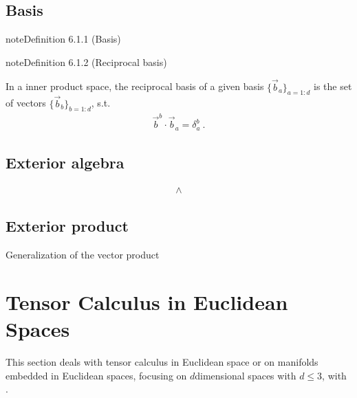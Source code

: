 \documentclass[letterpaper,10pt,english]{jupyterBook}
\begin{document}
\section{Basis}
\label{\detokenize{ch/tensor-algebra-calculus/algebra:basis}}\label{ch/tensor-algebra-calculus/algebra:definition-0}
\begin{sphinxadmonition}{note}{Definition 6.1.1 (Basis)}


\end{sphinxadmonition}
\label{ch/tensor-algebra-calculus/algebra:definition-1}
\begin{sphinxadmonition}{note}{Definition 6.1.2 (Reciprocal basis)}



\sphinxAtStartPar
In a inner product space, the reciprocal basis of a given basis \(\{ \vec{b}_a \}_{a=1:d}\) is the set of vectors \(\{ \vec{b}_{b} \}_{b=1:d}\), s.t.
\begin{equation*}
\begin{split}\vec{b}^b \cdot \vec{b}_a = \delta_a^b \ .\end{split}
\end{equation*}\end{sphinxadmonition}


\section{Exterior algebra}
\label{\detokenize{ch/tensor-algebra-calculus/algebra:exterior-algebra}}\begin{equation*}
\begin{split}\land\end{split}
\end{equation*}

\section{Exterior product}
\label{\detokenize{ch/tensor-algebra-calculus/algebra:exterior-product}}
\sphinxAtStartPar
Generalization of the vector product

\sphinxstepscope


\chapter{Tensor Calculus in Euclidean Spaces}
\label{\detokenize{ch/tensor-algebra-calculus/calculus-euclidean:tensor-calculus-in-euclidean-spaces}}\label{\detokenize{ch/tensor-algebra-calculus/calculus-euclidean:tensor-calculus}}\label{\detokenize{ch/tensor-algebra-calculus/calculus-euclidean::doc}}
\sphinxAtStartPar
This section deals with tensor calculus in Euclidean space or on manifolds embedded in Euclidean spaces, focusing on \(d\)\sphinxhyphen{}dimensional spaces with \(d \le 3\), with .
\end{document}
